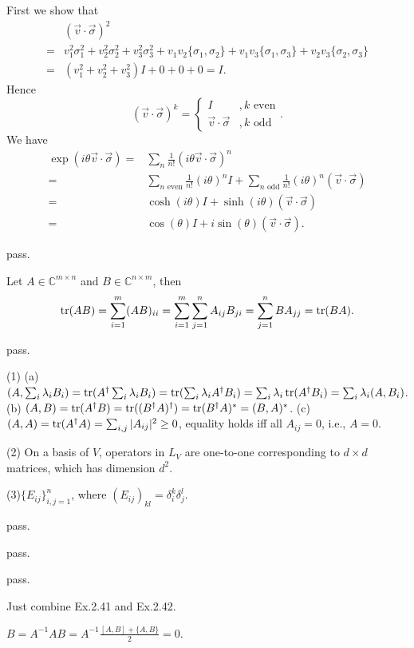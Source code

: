 \ex First we show that
$$\begin{aligned}
    & (\vec{v}\cdot\vec{\sigma})^2
    \\ = & v_1^2\sigma_1^2+v_2^2\sigma_2^2+v_3^2\sigma_3^2+v_1v_2\{\sigma_1,\sigma_2\}+v_1v_3\{\sigma_1,\sigma_3\}+v_2v_3\{\sigma_2,\sigma_3\}
    \\ = & (v_1^2+v_2^2+v_3^2)I+0+0+0=I.
\end{aligned}$$
Hence
$$(\vec{v}\cdot\vec{\sigma})^k=\begin{cases}I&,k\text{ even}\\\vec{v}\cdot\vec{\sigma}&,k\text{ odd}\end{cases}.$$
We have
$$\begin{aligned}
    \exp(i\theta\vec{v}\cdot\vec{\sigma}) = & \sum_n\frac{1}{n!}(i\theta\vec{v}\cdot\vec{\sigma})^n
    \\ = & \sum_{n\text{ even}}\frac{1}{n!}(i\theta)^nI+\sum_{n\text{ odd}}\frac{1}{n!}(i\theta)^n(\vec{v}\cdot\vec{\sigma})
    \\ = & \cosh(i\theta)I+\sinh(i\theta)(\vec{v}\cdot\vec{\sigma})
    \\ = & \cos(\theta)I+i\sin(\theta)(\vec{v}\cdot\vec{\sigma}).
\end{aligned}$$

\ex pass.

\ex Let $A\in\mathbb{C}^{m\times n}$ and $B\in\mathbb{C}^{n\times m}$, then
$$\operatorname{tr}(AB)=\sum_{i=1}^m(AB)_{ii}=\sum_{i=1}^m\sum_{j=1}^nA_{ij}B_{ji}=\sum_{j=1}^nBA_{jj}=\operatorname{tr}(BA).$$

\ex pass.

\ex (1) (a)$(A, \sum_i\lambda_iB_i)=\operatorname{tr}(A^\dagger\sum_i\lambda_iB_i)=\operatorname{tr}(\sum_i\lambda_iA^\dagger B_i)=\sum_i\lambda_i\operatorname{tr}(A^\dagger B_i)=\sum_i\lambda_i(A, B_i)$.
(b) $(A,B)=\operatorname{tr}(A^\dagger B)=\operatorname{tr}((B^\dagger A)^\dagger)=\operatorname{tr}(B^\dagger A)^*=(B,A)^*$.
(c) $(A,A)=\operatorname{tr}(A^\dagger A)=\sum_{i,j}|A_{ij}|^2\ge 0$, equality holds iff all $A_{ij}=0$, i.e., $A=0$.

(2) On a basis of $V$, operators in $L_V$ are one-to-one corresponding to $d\times d$ matrices, which has dimension $d^2$.

(3)$\{E_{ij}\}_{i,j=1}^n$, where $(E_{ij})_{kl}=\delta_i^k\delta_j^l$.

\ex pass.

\ex pass.

\ex pass.

\ex Just combine Ex.2.41 and Ex.2.42.

\ex $B=A^{-1}AB=A^{-1}\frac{[A,B]+\{A,B\}}{2}=0$.

